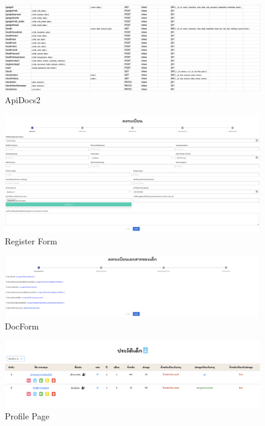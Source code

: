 \begin{figure}
  \begin{center}
    \includegraphics[width=\linewidth]{images/ApiDocTwo.png}
  \end{center}
  \caption[Poem]{ApiDocs2}
  \label{fig:ApiDocs2}
\end{figure}

\begin{figure}
  \begin{center}
  \includegraphics[width=\linewidth]{images/RegisterForm.png}
  \end{center}
  \caption[Poem]{Register Form}
  \label{fig:register}
  \end{figure}

\begin{figure}
  \begin{center}
  \includegraphics[width=\linewidth]{images/DocForm.png}
  \end{center}
  \caption[Poem]{DocForm}
  \label{fig:docForm}
  \end{figure}

\begin{figure}
  \begin{center}
  \includegraphics[width=\linewidth]{images/Profile.png}
  \end{center}
  \caption[Poem]{Profile Page}
  \label{fig:Profile}
  \end{figure}

